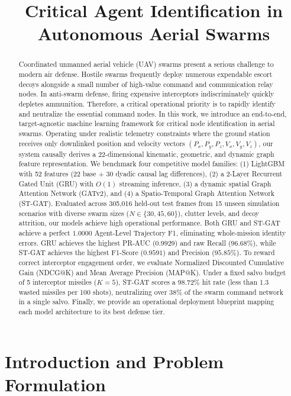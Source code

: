 \documentclass[9pt]{ieeeconf}
\title{Critical Agent Identification in Autonomous Aerial Swarms}
\begin{document}
\maketitle

\begin{abstract}
Coordinated unmanned aerial vehicle (UAV) swarms present a serious challenge to modern air defense. Hostile swarms frequently deploy numerous expendable escort decoys alongside a small number of high-value command and communication relay nodes. In anti-swarm defense, firing expensive interceptors indiscriminately quickly depletes ammunition. Therefore, a critical operational priority is to rapidly identify and neutralize the essential command nodes. In this work, we introduce an end-to-end, target-agnostic machine learning framework for critical node identification in aerial swarms. Operating under realistic telemetry constraints where the ground station receives only downlinked position and velocity vectors $(P_x, P_y, P_z, V_x, V_y, V_z)$, our system causally derives a 22-dimensional kinematic, geometric, and dynamic graph feature representation. We benchmark four competitive model families: (1) LightGBM with 52 features (22 base + 30 dyadic causal lag differences), (2) a 2-Layer Recurrent Gated Unit (GRU) with $O(1)$ streaming inference, (3) a dynamic spatial Graph Attention Network (GATv2), and (4) a Spatio-Temporal Graph Attention Network (ST-GAT). Evaluated across 305,016 held-out test frames from 15 unseen simulation scenarios with diverse swarm sizes ($N \in \{30, 45, 60\}$), clutter levels, and decoy attrition, our models achieve high operational performance. Both GRU and ST-GAT achieve a perfect $1.0000$ Agent-Level Trajectory F1, eliminating whole-mission identity errors. GRU achieves the highest PR-AUC ($0.9929$) and raw Recall ($96.68\%$), while ST-GAT achieves the highest F1-Score ($0.9591$) and Precision ($95.85\%$). To reward correct interceptor engagement order, we evaluate Normalized Discounted Cumulative Gain (NDCG@K) and Mean Average Precision (MAP@K). Under a fixed salvo budget of 5 interceptor missiles ($K=5$), ST-GAT scores a $98.72\%$ hit rate (less than 1.3 wasted missiles per 100 shots), neutralizing over $38\%$ of the swarm command network in a single salvo. Finally, we provide an operational deployment blueprint mapping each model architecture to its best defense tier.
\end{abstract}

\section{Introduction and Problem Formulation}
\label{sec:intro}
\end{document}
